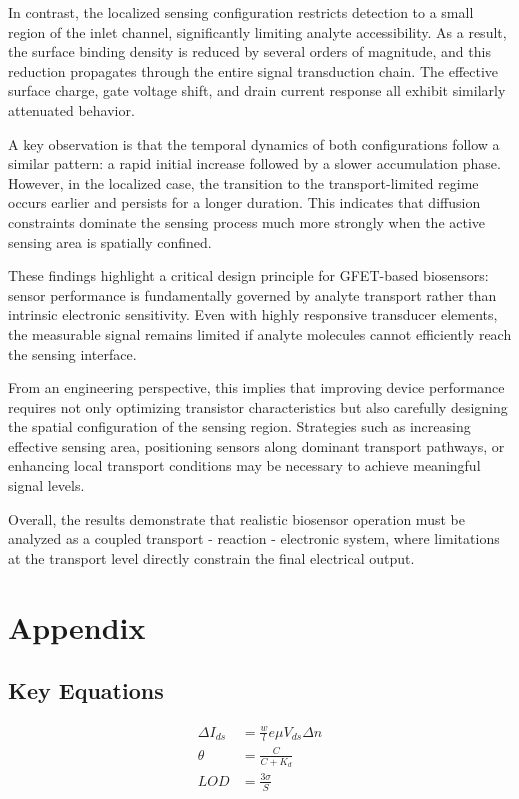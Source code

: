 \documentclass[12pt,a4paper]{report}
\begin{document}
In contrast, the localized sensing configuration restricts detection to a small region of the inlet channel, significantly limiting analyte accessibility. As a result, the surface binding density is reduced by several orders of magnitude, and this reduction propagates through the entire signal transduction chain. The effective surface charge, gate voltage shift, and drain current response all exhibit similarly attenuated behavior.

A key observation is that the temporal dynamics of both configurations follow a similar pattern: a rapid initial increase followed by a slower accumulation phase. However, in the localized case, the transition to the transport-limited regime occurs earlier and persists for a longer duration. This indicates that diffusion constraints dominate the sensing process much more strongly when the active sensing area is spatially confined.

These findings highlight a critical design principle for GFET-based biosensors: sensor performance is fundamentally governed by analyte transport rather than intrinsic electronic sensitivity. Even with highly responsive transducer elements, the measurable signal remains limited if analyte molecules cannot efficiently reach the sensing interface.

From an engineering perspective, this implies that improving device performance requires not only optimizing transistor characteristics but also carefully designing the spatial configuration of the sensing region. Strategies such as increasing effective sensing area, positioning sensors along dominant transport pathways, or enhancing local transport conditions may be necessary to achieve meaningful signal levels.

Overall, the results demonstrate that realistic biosensor operation must be analyzed as a coupled transport - reaction - electronic system, where limitations at the transport level directly constrain the final electrical output.



\appendix
\chapter{Appendix}
\section{Key Equations}
\begin{align}
  \Delta I_{ds} &= \frac{w}{l} e \mu V_{ds} \Delta n \\
  \theta &= \frac{C}{C + K_d} \\
  LOD &= \frac{3\sigma}{S}
\end{align}
\end{document}
